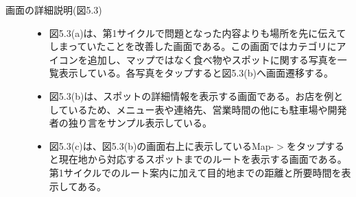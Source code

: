 \begin{description}
\item[画面の詳細説明(図5.3)]\mbox{}
\begin{itemize}
 \item 図5.3(a)は、第1サイクルで問題となった内容よりも場所を先に伝えてしまっていたことを改善した画面である。この画面ではカテゴリにアイコンを追加し、マップではなく食べ物やスポットに関する写真を一覧表示している。各写真をタップすると図5.3(b)へ画面遷移する。
 \item 図5.3(b)は、スポットの詳細情報を表示する画面である。お店を例としているため、メニュー表や連絡先、営業時間の他にも駐車場や開発者の独り言をサンプル表示している。
 \item 図5.3(c)は、図5.3(b)の画面右上に表示しているMap-$>$をタップすると現在地から対応するスポットまでのルートを表示する画面である。第1サイクルでのルート案内に加えて目的地までの距離と所要時間を表示してある。 \newpage

\end{itemize}
\end{description}

